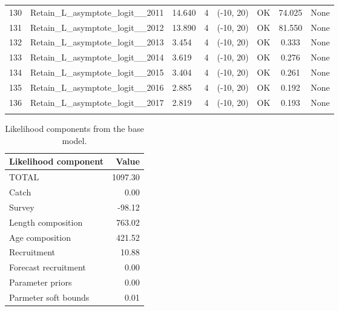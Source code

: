 \documentclass[12pt,]{article}
\begin{document}
\begin{landscape}
\begin{longtable}{lp{2.5in}lrcccl}
  130 & Retain\_L\_asymptote\_logit\_\_2011 & 14.640 & 4 & (-10, 20) & OK & 74.025 & None \\ 
  131 & Retain\_L\_asymptote\_logit\_\_2012 & 13.890 & 4 & (-10, 20) & OK & 81.550 & None \\ 
  132 & Retain\_L\_asymptote\_logit\_\_2013 & 3.454 & 4 & (-10, 20) & OK & 0.333 & None \\ 
  133 & Retain\_L\_asymptote\_logit\_\_2014 & 3.619 & 4 & (-10, 20) & OK & 0.276 & None \\ 
  134 & Retain\_L\_asymptote\_logit\_\_2015 & 3.404 & 4 & (-10, 20) & OK & 0.261 & None \\ 
  135 & Retain\_L\_asymptote\_logit\_\_2016 & 2.885 & 4 & (-10, 20) & OK & 0.192 & None \\ 
  136 & Retain\_L\_asymptote\_logit\_\_2017 & 2.819 & 4 & (-10, 20) & OK & 0.193 & None \\ 
   \hline
\hline
\label{tab:model_params}
\end{longtable}
\end{landscape}

\FloatBarrier

\begin{table}[ht]
\centering
\caption{Likelihood components from the base model.} 
\label{tab:like_components}
\begin{tabular}{lr}
  \hline
Likelihood component & Value \\ 
  \hline
TOTAL & 1097.30 \\ 
  Catch & 0.00 \\ 
  Survey & -98.12 \\ 
  Length composition & 763.02 \\ 
  Age composition & 421.52 \\ 
  Recruitment & 10.88 \\ 
  Forecast recruitment & 0.00 \\ 
  Parameter priors & 0.00 \\ 
  Parmeter soft bounds & 0.01 \\ 
   \hline
\end{tabular}
\end{table}

\newpage
\end{document}
